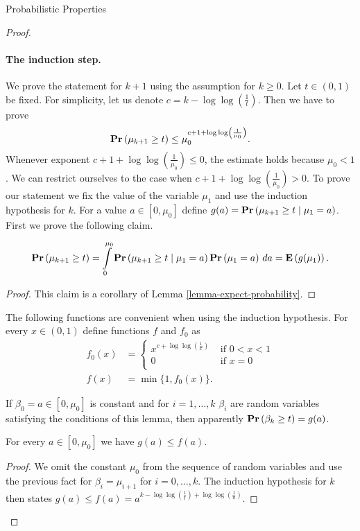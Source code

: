 \begin{section}{Probabilistic Properties}
\begin{proof}
\paragraph*{The induction step.} We prove the statement for $k + 1$ using the assumption for $k \geq 0$. Let $t \in (0, 1)$ be fixed. For simplicity, let us denote $c = k - \log \log \left(\frac{1}{t}\right)$. Then we have to prove
\[
	\mathbf{Pr}\left(\mu_{k + 1} \geq t\right) \leq \mu_0 ^ {c + 1 + \log \log \left(\frac{1}{\mu_0}\right)} \text{.}
\]
Whenever exponent $c + 1 + \log \log \left(\frac{1}{\mu_0}\right) \leq 0$, the estimate holds because $\mu_0 < 1$. We can restrict ourselves to the case when $c + 1 + \log \log \left(\frac{1}{\mu_0}\right) > 0$. To prove our statement we fix the value of the variable $\mu_1$ and use the induction hypothesis for $k$. For a value $a \in \left[0, \mu_0\right]$ define $g(a) = \mathbf{Pr}\left(\mu_{k + 1} \geq t \mid \mu_1 = a\right)$. First we prove the following claim.
\begin{claim}
\label{claim-expected-value}
\[
	\mathbf{Pr}\left(\mu_{k + 1} \geq t\right) = \int\limits_{0}^{\mu_0}\mathbf{Pr}\left(\mu_{k + 1} \geq t \mid \mu_1 = a\right)\mathbf{Pr}\left(\mu_1 = a\right) \, da = \mathbf{E}\left(g(\mu_1)\right) \text{.}
\]
\end{claim}
\begin{proof}
This claim is a corollary of Lemma \ref{lemma-expect-probability}.
\end{proof}

The following functions are convenient when using the induction hypothesis. For every $x \in (0, 1)$ define functions $f$ and $f_0$ as
\[ 
\begin{split}
f_0(x) &= \begin{cases}
	x ^ {c + \log \log \left(\frac{1}{x}\right)} & \text{ if } 0 < x < 1 \\ 
	0 & \text{ if } x = 0 \\
\end{cases} \\
f(x) & = \min \{1, f_0(x) \} \text{.} 
\end{split}
\]

If $\beta_0 = a \in \left[0, \mu_0 \right]$ is constant and for $i = 1, \dots, k$ $\beta_i$ are random variables satisfying the conditions of this lemma, then apparently $\mathbf{Pr}\left(\beta_k \geq t\right) = g(a)$. 

\begin{claim}
\label{claim-estimate-g}
For every $a \in \left[0, \mu_0 \right]$ we have $g(a) \leq f(a)$.
\end{claim}
\begin{proof}
We omit the constant $\mu_0$ from the sequence of random variables and use the previous fact for $\beta_{i} = \mu_{i + 1}$ for $i = 0, \dots, k$. The induction hypothesis for $k$ then states $g(a) \leq f(a) = a^{k - \log \log \left(\frac{1}{t}\right) + \log \log \left(\frac{1}{a}\right)}$. 
\end{proof}


\end{proof}
\end{section}
